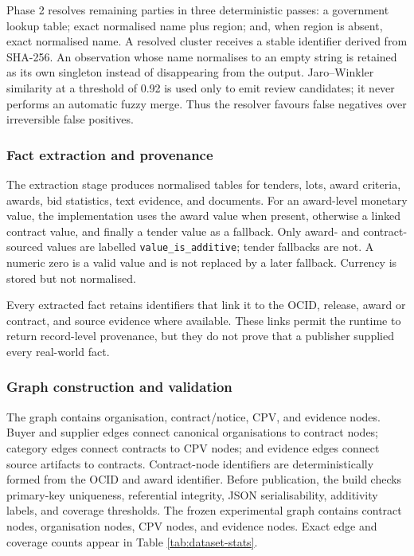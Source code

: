 Phase 2 resolves remaining parties in three deterministic passes: a government lookup table;
exact normalised name plus region; and, when region is absent, exact normalised name.  A resolved
cluster receives a stable identifier derived from SHA-256.  An observation whose name
normalises to an empty string is retained as its own singleton instead of disappearing from the
output.  Jaro--Winkler similarity at a threshold of 0.92 is used only to emit review candidates;
it never performs an automatic fuzzy merge.  Thus the resolver favours false negatives over
irreversible false positives.

\subsubsection{Fact extraction and provenance}

The extraction stage produces normalised tables for tenders, lots, award criteria, awards, bid
statistics, text evidence, and documents.  For an award-level monetary value, the implementation
uses the award value when present, otherwise a linked contract value, and finally a tender value
as a fallback.  Only award- and contract-sourced values are labelled
\texttt{value\_is\_additive}; tender fallbacks are not.  A numeric zero is a valid value and is
not replaced by a later fallback.  Currency is stored but not normalised.

Every extracted fact retains identifiers that link it to the OCID, release, award or contract,
and source evidence where available.  These links permit the runtime to return record-level
provenance, but they do not prove that a publisher supplied every real-world fact.

\subsubsection{Graph construction and validation}

The graph contains organisation, contract/notice, CPV, and evidence nodes.  Buyer and supplier
edges connect canonical organisations to contract nodes; category edges connect contracts to
CPV nodes; and evidence edges connect source artifacts to contracts.  Contract-node identifiers
are deterministically formed from the OCID and award identifier.  Before publication, the build
checks primary-key uniqueness, referential integrity, JSON serialisability, additivity labels,
and coverage thresholds.  The frozen experimental graph contains \KGContracts contract nodes,
\KGOrgs organisation nodes, \KGCPV CPV nodes, and \KGEvidence evidence nodes.  Exact edge and
coverage counts appear in Table \ref{tab:dataset-stats}.

